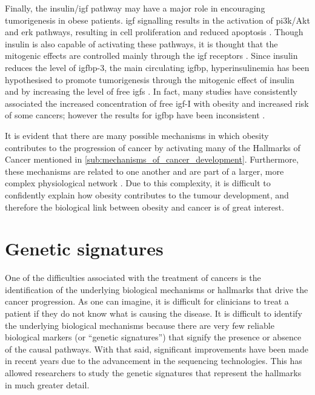 Finally, the insulin/\gls{igf} pathway may have a major role in encouraging tumorigenesis in obese patients.
\gls{igf} signalling results in the activation of \gls{pi3k}/Akt and \gls{erk} pathways, resulting in cell proliferation and reduced apoptosis \citep{Roberts2010}.
Though insulin is also capable of activating these pathways, it is thought that the mitogenic effects are controlled mainly through the \gls{igf} receptors \citep{Roberts2010}.
Since insulin reduces the level of \gls{igfbp}-3, the main circulating \gls{igfbp}, hyperinsulinemia has been hypothesised to promote tumorigenesis through the mitogenic effect of insulin and by increasing the level of free \glspl{igf} \citep{Giovannucci1995,Mckeown1994,Roberts2010}.
In fact, many studies have consistently associated the increased concentration of free \gls{igf}-I with obesity and increased risk of some cancers; however the results for \gls{igfbp} have been inconsistent \citep{Basen2011}.

It is evident that there are many possible mechanisms in which obesity contributes to the progression of cancer by activating many of the Hallmarks of Cancer mentioned in \cref{sub:mechanisms_of_cancer_development}.
Furthermore, these mechanisms are related to one another and are part of a larger, more complex physiological network \citep{Renehan2006}.
Due to this complexity, it is difficult to confidently explain how obesity contributes to the tumour development, and therefore the biological link between obesity and cancer is of great interest.

\section{Genetic signatures}
\label{sec:genetic_signatures}

One of the difficulties associated with the treatment of cancers is the identification of the underlying biological mechanisms or hallmarks that drive the cancer progression.
As one can imagine, it is difficult for clinicians to treat a patient if they do not know what is causing the disease.
It is difficult to identify the underlying biological mechanisms because there are very few reliable biological markers (or ``genetic signatures'') that signify the presence or absence of the causal pathways.
With that said, significant improvements have been made in recent years due to the advancement in the sequencing technologies.
This has allowed researchers to study the genetic signatures that represent the hallmarks in much greater detail.

